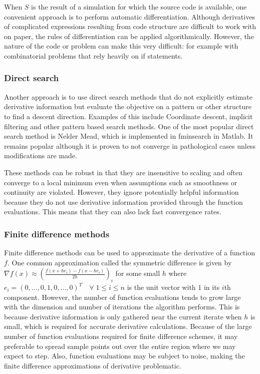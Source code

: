 When $S$ is the result of a simulation for which the source code is available, one convenient approach is to perform automatic differentiation.
Although derivatives of complicated expressions resulting from code structure are difficult to work with on paper, the rules of differentiation can be applied algorithmically.
However, the nature of the code or problem can make this very difficult: for example with combinatorial problems that rely heavily on if statements.

\subsubsection{Direct search}


Another approach is to use direct search methods that do not explicitly estimate derivative information but evaluate the objective on a pattern or other structure to find a descent direction.
Examples of this include Coordinate descent, implicit filtering and other pattern based search methods.
One of the most popular direct search method is Nelder Mead, which is implemented in fminsearch in Matlab.
It remains popular although it is proven to not converge in pathological cases unless modifications are made.

These methods can be robust in that they are insensitive to scaling and often converge to a local minimum even when assumptions such as smoothness or continuity are violated.
However, they ignore potentially helpful information because they do not use derivative information provided through the function evaluations.
This means that they can also lack fast convergence rates.


\subsubsection{Finite difference methods}

Finite difference methods can be used to approximate the derivative of a function $f$.
One common approximation called the symmetric difference is given by $\nabla f(x) \approx (\frac{f(x+he_i) - f(x-he_i)}{2h})_i$ for some small $h$ where $e_i = (0,\ldots, 0, 1, 0, \ldots, 0)^T \quad \forall \; 1 \le i \le n$ is the unit vector with $1$ in its $i$th component.
However, the number of function evaluations tends to grow large with the dimension and number of iterations the algorithm performs.
This is because derivative information is only gathered near the current iterate when $h$ is small, which is required for accurate derivative calculations.
Because of the large number of function evaluations required for finite difference schemes, it may preferable to spread sample points out over the entire region where we may expect to step.
Also, function evaluations may be subject to noise, making the finite difference approximations of derivative problematic.

